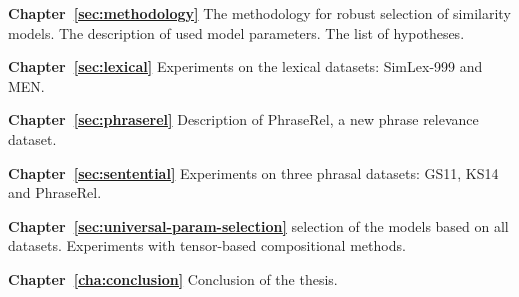\textbf{Chapter~\ref{sec:methodology}} The methodology for robust selection of similarity models. The description of used model parameters. The list of hypotheses.

\textbf{Chapter~\ref{sec:lexical}} Experiments on the lexical datasets: SimLex-999 and MEN.

\textbf{Chapter~\ref{sec:phraserel}} Description of PhraseRel, a new phrase relevance dataset.

\textbf{Chapter~\ref{sec:sentential}} Experiments on three phrasal datasets: GS11, KS14 and PhraseRel.

\textbf{Chapter~\ref{sec:universal-param-selection}} selection of the models based on all datasets. Experiments with tensor-based compositional methods.

\textbf{Chapter~\ref{cha:conclusion}} Conclusion of the thesis.

